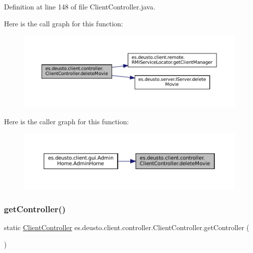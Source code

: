 Definition at line 148 of file Client\+Controller.\+java.

Here is the call graph for this function\+:
\nopagebreak
\begin{figure}[H]
\begin{center}
\leavevmode
\includegraphics[width=350pt]{classes_1_1deusto_1_1client_1_1controller_1_1_client_controller_acf2fc3025cb669a68fc0de5b1e3ee243_cgraph}
\end{center}
\end{figure}
Here is the caller graph for this function\+:
\nopagebreak
\begin{figure}[H]
\begin{center}
\leavevmode
\includegraphics[width=350pt]{classes_1_1deusto_1_1client_1_1controller_1_1_client_controller_acf2fc3025cb669a68fc0de5b1e3ee243_icgraph}
\end{center}
\end{figure}
\mbox{\label{classes_1_1deusto_1_1client_1_1controller_1_1_client_controller_aa76786bb097da98592adb6aeefa8d996}} 
\subsubsection{\texorpdfstring{getController()}{getController()}}
{\footnotesize\ttfamily static \mbox{\hyperlink{classes_1_1deusto_1_1client_1_1controller_1_1_client_controller}{Client\+Controller}} es.\+deusto.\+client.\+controller.\+Client\+Controller.\+get\+Controller (\begin{DoxyParamCaption}{ }\end{DoxyParamCaption})\hspace{0.3cm}{\ttfamily [static]}}



